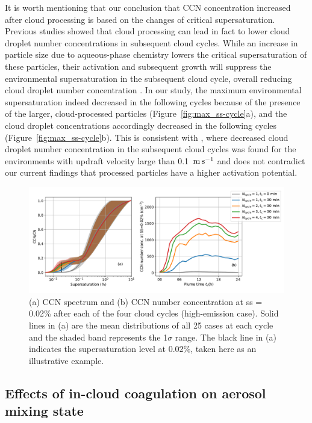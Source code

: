 \documentclass[edeposit,fullpage]{uiucthesis2009}
\begin{document}
It is worth mentioning that our conclusion that CCN concentration
increased after cloud processing is based on the changes of critical
supersaturation. Previous studies showed that cloud processing can
lead in fact to lower cloud droplet number concentrations in
subsequent cloud cycles. While an increase in particle size due to
aqueous-phase chemistry lowers the critical supersaturation of these
particles, their activation and subsequent growth will suppress
the environmental supersaturation in the
subsequent cloud cycle, overall reducing cloud droplet number
concentration \cite{choularton1997effect, feingold2000does,
  romakkaniemi2006influence,
  ivanova2008aerosol,bower1999modelling}. In our study, the maximum
environmental supersaturation indeed decreased in the following cycles
because of the presence of the larger, cloud-processed particles
(Figure~\ref{fig:max_ss-cycle}a), and the cloud droplet concentrations
accordingly decreased in the following cycles
(Figure~\ref{fig:max_ss-cycle}b). This is consistent with
\citet{feingold2000does}, where decreased cloud droplet number
concentration in the subsequent cloud cycles was found for the
environments with updraft velocity large than 0.1~$\rm m \, s^{-1}$
and does not contradict our current findings that processed particles
have a higher activation potential.


\begin{figure}
    \centering
    \includegraphics[scale=0.4]{chap3_figs/fig11.pdf}
    \caption{(a) CCN spectrum and (b) CCN number
      concentration at ss = 0.02\% after each of the four cloud
      cycles (high-emission case). Solid lines in (a) are the
      mean distributions of all 25 cases at each cycle and the shaded
      band represents the 1$\sigma$ range. The black line in (a)
      indicates the supersaturation level at 0.02\%, taken here
        as an illustrative example.}
    \label{fig:cycle_ccn}
\end{figure}

\subsection{Effects of in-cloud coagulation on aerosol mixing state} 
\label{sec:coag}
\end{document}
